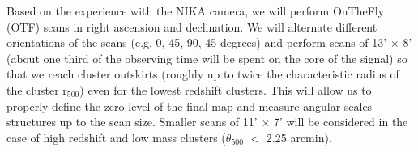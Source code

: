 \documentclass[11pt,a4paper,twoside,graphicx,color]{article}
\begin{document}



\vspace{0.3cm}  
Based on the experience with the NIKA camera, we will perform OnTheFly (OTF) scans in right ascension and declination. We will alternate different orientations of the scans (e.g. 0, 45, 90,-45 degrees) and perform scans of 13' $\times$ 8' (about one third of the observing time will be spent on the core of the signal) so that we reach cluster outskirts (roughly up to twice the characteristic radius of the cluster r$_{500}$) even for the lowest redshift clusters. This will allow us to properly define the zero level of the final map and measure angular scales structures up to the scan size. Smaller scans of 11' $\times$ 7' will be considered in the case of high redshift and low mass clusters ($\theta_{500}$ $<$ 2.25 arcmin). 
\end{document}
